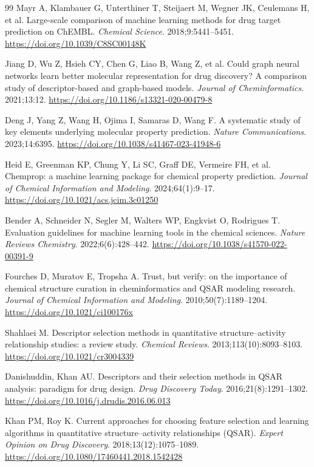 \begin{thebibliography}{99}
Mayr A, Klambauer G, Unterthiner T, Steijaert M, Wegner JK, Ceulemans H, et al. Large-scale comparison of machine learning methods for drug target prediction on ChEMBL. \emph{Chemical Science}. 2018;9:5441--5451. \url{https://doi.org/10.1039/C8SC00148K}

Jiang D, Wu Z, Hsieh CY, Chen G, Liao B, Wang Z, et al. Could graph neural networks learn better molecular representation for drug discovery? A comparison study of descriptor-based and graph-based models. \emph{Journal of Cheminformatics}. 2021;13:12. \url{https://doi.org/10.1186/s13321-020-00479-8}

Deng J, Yang Z, Wang H, Ojima I, Samaras D, Wang F. A systematic study of key elements underlying molecular property prediction. \emph{Nature Communications}. 2023;14:6395. \url{https://doi.org/10.1038/s41467-023-41948-6}

Heid E, Greenman KP, Chung Y, Li SC, Graff DE, Vermeire FH, et al. Chemprop: a machine learning package for chemical property prediction. \emph{Journal of Chemical Information and Modeling}. 2024;64(1):9--17. \url{https://doi.org/10.1021/acs.jcim.3c01250}

Bender A, Schneider N, Segler M, Walters WP, Engkvist O, Rodrigues T. Evaluation guidelines for machine learning tools in the chemical sciences. \emph{Nature Reviews Chemistry}. 2022;6(6):428--442. \url{https://doi.org/10.1038/s41570-022-00391-9}

Fourches D, Muratov E, Tropsha A. Trust, but verify: on the importance of chemical structure curation in cheminformatics and QSAR modeling research. \emph{Journal of Chemical Information and Modeling}. 2010;50(7):1189--1204. \url{https://doi.org/10.1021/ci100176x}

Shahlaei M. Descriptor selection methods in quantitative structure--activity relationship studies: a review study. \emph{Chemical Reviews}. 2013;113(10):8093--8103. \url{https://doi.org/10.1021/cr3004339}

Danishuddin, Khan AU. Descriptors and their selection methods in QSAR analysis: paradigm for drug design. \emph{Drug Discovery Today}. 2016;21(8):1291--1302. \url{https://doi.org/10.1016/j.drudis.2016.06.013}

Khan PM, Roy K. Current approaches for choosing feature selection and learning algorithms in quantitative structure--activity relationships (QSAR). \emph{Expert Opinion on Drug Discovery}. 2018;13(12):1075--1089. \url{https://doi.org/10.1080/17460441.2018.1542428}


\end{thebibliography}
